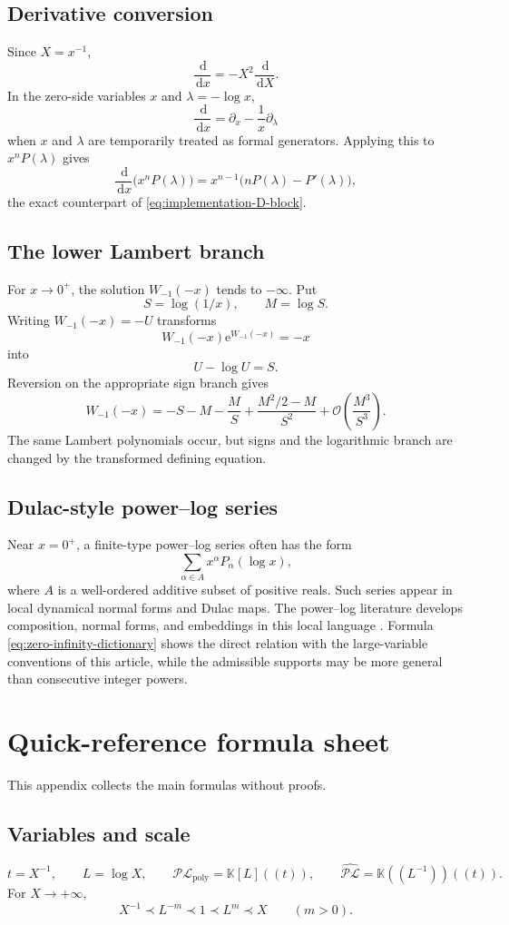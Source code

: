\documentclass[11pt,oneside]{book}
\theoremstyle{definition}
\theoremstyle{remark}
\newcommand{\K}{\mathbb K}
\newcommand{\PLpoly}{\mathscr{PL}_{\mathrm{poly}}}
\newcommand{\PLfield}{\widehat{\mathscr{PL}}}
\newcommand{\e}{\mathrm e}
\newcommand{\dd}{\,\mathrm d}
\newcommand{\bigO}{\mathcal O}
\newcommand{\precdom}{\prec}
\begin{document}
\section{Derivative conversion}
Since $X=x^{-1}$,
\[
 \frac{\dd}{\dd x}=-X^2\frac{\dd}{\dd X}.
\]
In the zero-side variables $x$ and $\lambda=-\log x$,
\[
 \frac{\dd}{\dd x}
 =\partial_x-\frac1x\partial_\lambda
\]
when $x$ and $\lambda$ are temporarily treated as formal generators.
Applying this to $x^nP(\lambda)$ gives
\[
 \frac{\dd}{\dd x}\bigl(x^nP(\lambda)\bigr)
 =x^{n-1}\bigl(nP(\lambda)-P'(\lambda)\bigr),
\]
the exact counterpart of \eqref{eq:implementation-D-block}.

\section{The lower Lambert branch}
For $x\to0^+$, the solution $W_{-1}(-x)$ tends to $-\infty$. Put
\[
 S=\log(1/x),\qquad M=\log S.
\]
Writing $W_{-1}(-x)=-U$ transforms
\[
 W_{-1}(-x)\e^{W_{-1}(-x)}=-x
\]
into
\[
 U-\log U=S.
\]
Reversion on the appropriate sign branch gives
\[
 W_{-1}(-x)
 =-S-M-\frac{M}{S}
 +\frac{M^2/2-M}{S^2}
 +\bigO\!\left(\frac{M^3}{S^3}\right).
\]
The same Lambert polynomials occur, but signs and the logarithmic branch are
changed by the transformed defining equation.

\section{Dulac-style power--log series}
Near $x=0^+$, a finite-type power--log series often has the form
\[
 \sum_{\alpha\in A}x^\alpha P_\alpha(\log x),
\]
where $A$ is a well-ordered additive subset of positive reals. Such series
appear in local dynamical normal forms and Dulac maps. The power--log
literature develops composition, normal forms, and embeddings in this local
language \cite{MRRZ2016}. Formula \eqref{eq:zero-infinity-dictionary}
shows the direct relation with the large-variable conventions of this
article, while the admissible supports may be more general than consecutive
integer powers.

\chapter{Quick-reference formula sheet}
\label{app:quick-reference}

This appendix collects the main formulas without proofs.

\section*{Variables and scale}
\[
 t=X^{-1},\qquad L=\log X,\qquad
 \PLpoly=\K[L]((t)),\qquad
 \PLfield=\K((L^{-1}))((t)).
\]
For $X\to+\infty$,
\[
 X^{-1}\precdom L^{-m}\precdom1\precdom L^m\precdom X
 \qquad(m>0).
\]
\end{document}
